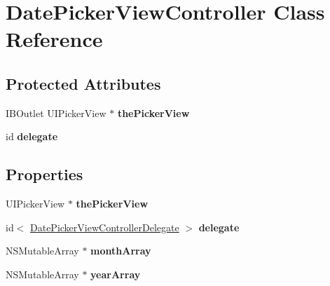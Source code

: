 \hypertarget{interface_date_picker_view_controller}{
\section{DatePickerViewController Class Reference}
\label{interface_date_picker_view_controller}
}
\subsection*{Protected Attributes}
\begin{DoxyCompactItemize}
\item 
\hypertarget{interface_date_picker_view_controller_afda8fe68b5a27da799b831a6b8f09cc9}{
IBOutlet UIPickerView $\ast$ {\bfseries thePickerView}}
\label{interface_date_picker_view_controller_afda8fe68b5a27da799b831a6b8f09cc9}

\item 
\hypertarget{interface_date_picker_view_controller_af0b30c7e9901efe4771ea71b361529c3}{
id {\bfseries delegate}}
\label{interface_date_picker_view_controller_af0b30c7e9901efe4771ea71b361529c3}

\end{DoxyCompactItemize}
\subsection*{Properties}
\begin{DoxyCompactItemize}
\item 
\hypertarget{interface_date_picker_view_controller_ad3e34ff50bc21a10a765125f0c9add08}{
UIPickerView $\ast$ {\bfseries thePickerView}}
\label{interface_date_picker_view_controller_ad3e34ff50bc21a10a765125f0c9add08}

\item 
\hypertarget{interface_date_picker_view_controller_a2e535fb7e3256251db35c4429ac5b32e}{
id$<$ \hyperlink{protocol_date_picker_view_controller_delegate-p}{DatePickerViewControllerDelegate} $>$ {\bfseries delegate}}
\label{interface_date_picker_view_controller_a2e535fb7e3256251db35c4429ac5b32e}

\item 
\hypertarget{interface_date_picker_view_controller_a7ffcdb24aa696fdba4f15f8f0e28bf62}{
NSMutableArray $\ast$ {\bfseries monthArray}}
\label{interface_date_picker_view_controller_a7ffcdb24aa696fdba4f15f8f0e28bf62}

\item 
\hypertarget{interface_date_picker_view_controller_a81416a7ae091f4e6ad1438b5c41a3480}{
NSMutableArray $\ast$ {\bfseries yearArray}}
\label{interface_date_picker_view_controller_a81416a7ae091f4e6ad1438b5c41a3480}

\end{DoxyCompactItemize}


